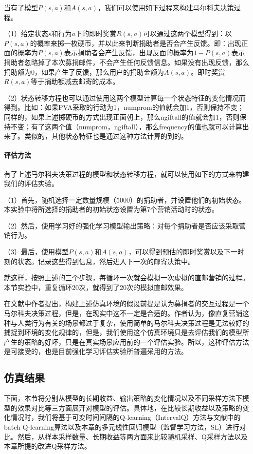 当有了模型$P(s,a)$和$A(s,a)$，我们可以使用如下过程来构建马尔科夫决策过程。

（1）给定状态$s$和行为$a$下的即时奖赏$R(s,a)$可以通过这两个模型得到：以$P(s,a)$的概率来掷一枚硬币，并以此来判断捐助者是否会产生反馈。即：出现正面的概率为$P(s,a)$表示捐助者会产生反馈，出现反面的概率为$1-P(s,a)$表示捐助者忽略掉了本次募捐邮件，不会产生任何反馈信息。如果没有出现反馈，那么捐助额为$0$，如果产生了反馈，那么用户的捐助金额为$A(s,a)$。即时奖赏$R(s,a)$等于捐助额减去邮寄的成本。

（2）状态转移方程也可以通过使用这两个模型计算每一个状态特征的变化情况而得到。比如：如果PVA采取的行动为1，numprom的值就会加1，否则保持不变；同样的，如果上述掷硬币的方式出现正面朝上，那么ngiftall的值就会加1，否则保持不变；有了这两个值（numprom，ngiftall），那么frequency的值也就可以计算出来了。类似的，其他状态特征也是通过这种方法计算的到的。

\paragraph{评估方法}
有了上述马尔科夫决策过程的模型和状态转移方程，就可以使用如下的方式来构建我们的评估实验。

（1）首先，随机选择一定数量规模（5000）的捐助者，并设置他们的初始状态。本实验中将所选择的捐助者的初始状态设置为第7个营销活动时的状态。

（2）然后，使用学习好的强化学习模型输出策略：对每个捐助者是否应该采取营销行为。

（3）最后，使用模型$P(s,a)$和$A(s,a)$，可以得到预估的即时奖赏以及下一时刻的状态。记录这些得到信息，然后进入下一次的邮寄决策中。

就这样，按照上述的三个步骤，每循环一次就会模拟一次虚拟的直邮营销的过程。本节实验中，重复循环20次，就得到了20次的模拟直邮效果。

在文献\citep{pednault2002sequential}中作者提出，构建上述仿真环境的假设前提是认为募捐者的交互过程是一个马尔科夫决策过程，但是，在现实中这不一定是合适的。作者认为，像直复营销这种与人类行为有关的场景都过于复杂，使用简单的马尔科夫决策过程是无法较好的捕捉到环境的变化规律的，但是，我们使用这个仿真环境只是去评估我们的模型所产生的策略的好坏，只是在真实场景应用前的一个评估实验。所以，这种评估方法是可接受的，也是目前强化学习评估实验所普遍采用的方法。

\subsection{仿真结果}
下面，本节将分别从模型的长期收益、输出策略的变化情况以及不同采样方法下模型的效果对比等三方面展开对模型的评估。具体地，在比较长期收益以及策略的变化情况时，我们将基于可变时间间隔的Q-learning（IntervalQ）方法与文献\citep{pednault2002sequential}中的batch Q-learning算法以及本章的多元线性回归模型（监督学习方法，SL）进行对比。然后，从样本采样数量、长期收益等两方面来比较随机采样、Q采样方法以及本章所提的改进Q采样方法。

